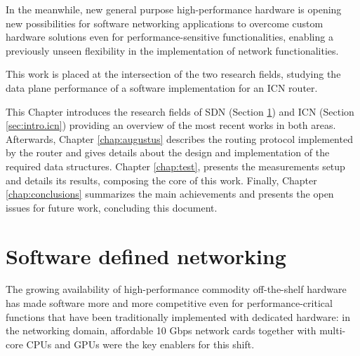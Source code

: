 \documentclass[11pt,a4paper,twoside,titlepage,openany]{book}
\begin{document}
In the meanwhile, new general purpose high-performance hardware is opening new possibilities for software networking applications to overcome custom hardware solutions even for performance-sensitive functionalities, enabling a previously unseen flexibility in the implementation of network functionalities.

This work is placed at the intersection of the two research fields, studying the data plane performance of a software implementation for an ICN router.

This Chapter introduces the research fields of \gls{SDN} (Section \ref{sec:intro.sdn}) and \gls{ICN} (Section \ref{sec:intro.icn}) providing an overview of the most recent works in both areas.
Afterwards, Chapter \ref{chap:augustus} describes the routing protocol implemented by the router and gives details about the design and implementation of the required data structures.
Chapter \ref{chap:test}, presents the measurements setup and details its results, composing the core of this work.
Finally, Chapter \ref{chap:conclusions} summarizes the main achievements and presents the open issues for future work, concluding this document.

\section{Software defined networking}\label{sec:intro.sdn}
The growing availability of high-performance commodity off-the-shelf %
hardware has made software more and more competitive even for performance-critical functions that have been traditionally implemented with dedicated hardware: in the networking domain, affordable 10 Gbps network cards together with multi-core CPUs and GPUs were the key enablers for this shift.

\end{document}
